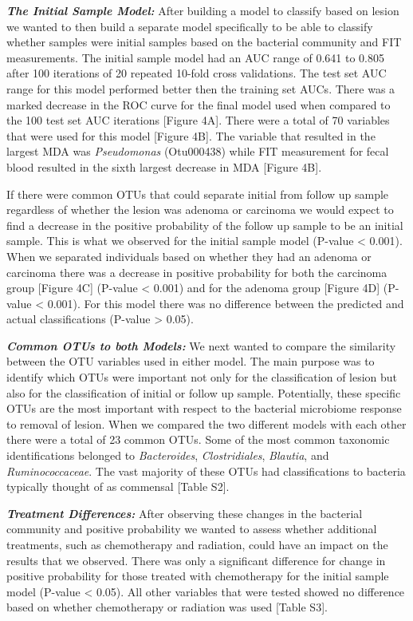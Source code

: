 \documentclass[12pt,]{article}
\begin{document}
\textbf{\emph{The Initial Sample Model:}} After building a model to
classify based on lesion we wanted to then build a separate model
specifically to be able to classify whether samples were initial samples
based on the bacterial community and FIT measurements. The initial
sample model had an AUC range of 0.641 to 0.805 after 100 iterations of
20 repeated 10-fold cross validations. The test set AUC range for this
model performed better then the training set AUCs. There was a marked
decrease in the ROC curve for the final model used when compared to the
100 test set AUC iterations {[}Figure 4A{]}. There were a total of 70
variables that were used for this model {[}Figure 4B{]}. The variable
that resulted in the largest MDA was \emph{Pseudomonas} (Otu000438)
while FIT measurement for fecal blood resulted in the sixth largest
decrease in MDA {[}Figure 4B{]}.

If there were common OTUs that could separate initial from follow up
sample regardless of whether the lesion was adenoma or carcinoma we
would expect to find a decrease in the positive probability of the
follow up sample to be an initial sample. This is what we observed for
the initial sample model (P-value \textless{} 0.001). When we separated
individuals based on whether they had an adenoma or carcinoma there was
a decrease in positive probability for both the carcinoma group
{[}Figure 4C{]} (P-value \textless{} 0.001) and for the adenoma group
{[}Figure 4D{]} (P-value \textless{} 0.001). For this model there was no
difference between the predicted and actual classifications (P-value
\textgreater{} 0.05).

\textbf{\emph{Common OTUs to both Models:}} We next wanted to compare
the similarity between the OTU variables used in either model. The main
purpose was to identify which OTUs were important not only for the
classification of lesion but also for the classification of initial or
follow up sample. Potentially, these specific OTUs are the most
important with respect to the bacterial microbiome response to removal
of lesion. When we compared the two different models with each other
there were a total of 23 common OTUs. Some of the most common taxonomic
identifications belonged to \emph{Bacteroides}, \emph{Clostridiales},
\emph{Blautia}, and \emph{Ruminococcaceae}. The vast majority of these
OTUs had classifications to bacteria typically thought of as commensal
{[}Table S2{]}.

\textbf{\emph{Treatment Differences:}} After observing these changes in
the bacterial community and positive probability we wanted to assess
whether additional treatments, such as chemotherapy and radiation, could
have an impact on the results that we observed. There was only a
significant difference for change in positive probability for those
treated with chemotherapy for the initial sample model (P-value
\textless{} 0.05). All other variables that were tested showed no
difference based on whether chemotherapy or radiation was used {[}Table
S3{]}.
\end{document}
